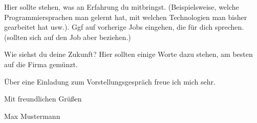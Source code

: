 \documentclass[a4paper,10pt]{article}
\newcommand{\nachname}{Mustermann }                      %
\newcommand{\vorname}{Max }
\begin{document}
Hier sollte stehen, was an Erfahrung du mitbringst. (Beispielsweise, welche Programmiersprachen man gelernt hat, mit welchen Technologien man bisher gearbeitet hat usw.). Ggf auf vorherige Jobs eingehen, die f\"ur dich sprechen. (sollten sich auf den Job aber beziehen.)

Wie siehst du deine Zukunft? Hier sollten einige Worte dazu stehen, am besten auf die Firma gem\"unzt. 

\"Uber eine Einladung zum Vorstellungsgespr\"ach freue ich mich sehr.

\bigskip
Mit freundlichen Gr\"u{\ss}en

\bigskip

\vorname \nachname
\end{document}
